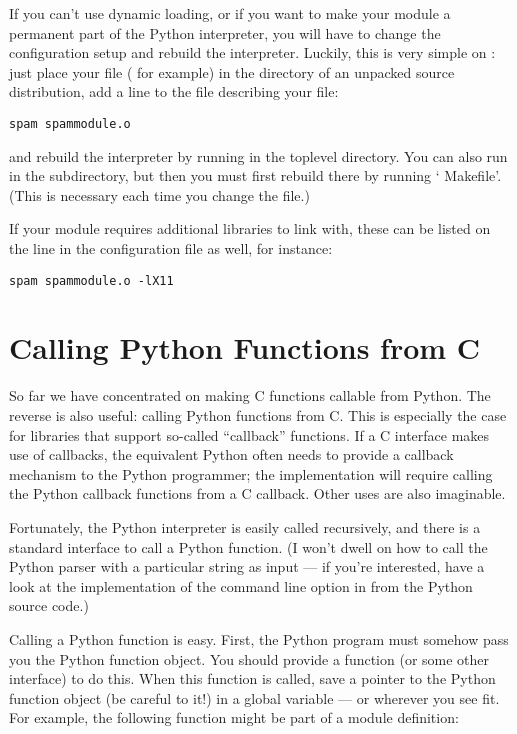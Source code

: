 If you can't use dynamic loading, or if you want to make your module a
permanent part of the Python interpreter, you will have to change the
configuration setup and rebuild the interpreter.  Luckily, this is
very simple on \UNIX: just place your file ( for
example) in the  directory of an unpacked source
distribution, add a line to the file 
describing your file:

\begin{verbatim}
spam spammodule.o
\end{verbatim}

and rebuild the interpreter by running  in the toplevel
directory.  You can also run  in the 
subdirectory, but then you must first rebuild 
there by running ` Makefile'.  (This is necessary each
time you change the  file.)

If your module requires additional libraries to link with, these can
be listed on the line in the configuration file as well, for instance:

\begin{verbatim}
spam spammodule.o -lX11
\end{verbatim}

\section{Calling Python Functions from C
         \label{callingPython}}

So far we have concentrated on making C functions callable from
Python.  The reverse is also useful: calling Python functions from C.
This is especially the case for libraries that support so-called
``callback'' functions.  If a C interface makes use of callbacks, the
equivalent Python often needs to provide a callback mechanism to the
Python programmer; the implementation will require calling the Python
callback functions from a C callback.  Other uses are also imaginable.

Fortunately, the Python interpreter is easily called recursively, and
there is a standard interface to call a Python function.  (I won't
dwell on how to call the Python parser with a particular string as
input --- if you're interested, have a look at the implementation of
the  command line option in 
from the Python source code.)

Calling a Python function is easy.  First, the Python program must
somehow pass you the Python function object.  You should provide a
function (or some other interface) to do this.  When this function is
called, save a pointer to the Python function object (be careful to
 it!) in a global variable --- or wherever you
see fit. For example, the following function might be part of a module
definition:

